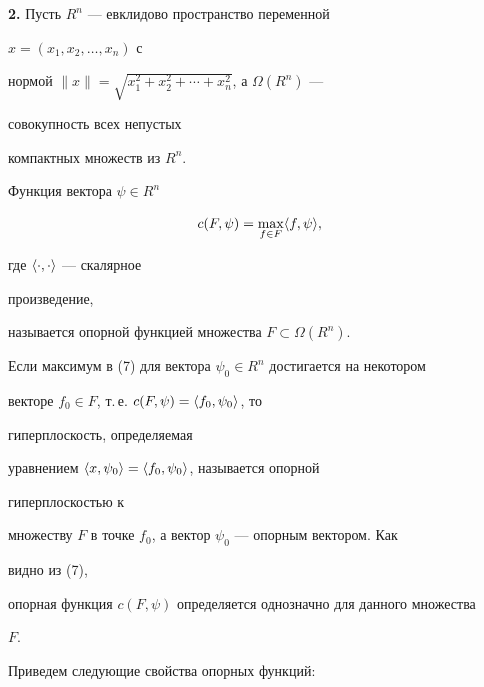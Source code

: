 \medskip 


 


{\bf 2.} Пусть $R^n$ --- евклидово пространство переменной 


$x=(x_1,x_2,\dotsc,x_n)$ с 


нормой $\|x\|=\sqrt{x^2_1+x^2_2+\dotsb+x^2_n}$, а $\Omega(R^n)$ --- 


совокупность всех непустых 


компактных множеств из $R^n$. 


 


Функция вектора $\psi\in R^n$ 


\begin{equation} 


c(F,\psi)=\max_{f\in F}\la f,\psi\ra ,


\end{equation} 


где $\langle\cdot,\cdot\rangle$ --- скалярное 


произведение, 


называется опорной функцией множества $F\subset\Omega(R^n)$. 


 


Если максимум в (7) для вектора $\psi_0\in R^n$ достигается на некотором 


векторе $f_0\in F$, т.\,е. $c(F,\psi)=\langle f_0,\psi_0\rangle$, то 


гиперплоскость, определяемая 


уравнением $\langle x,\psi_0\rangle=\langle f_0,\psi_0\rangle$, называется опорной 


гиперплоскостью к 


множеству $F$ в точке $f_0$, а вектор $\psi_0$ --- опорным вектором. Как 


видно из (7), 


опорная функция $c(F,\psi)$ определяется однозначно для данного множества 


$F$. 


 


 


Приведем следующие свойства опорных функций: 


